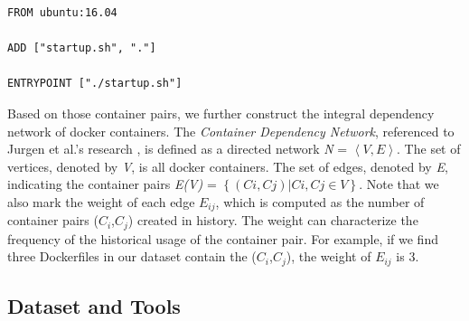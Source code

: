 \documentclass[sigconf]{acmart}
\begin{document}
\begin{lstlisting}[caption= An example of Dockerfile of container Tomcat]
FROM ubuntu:16.04  

ADD ["startup.sh", "."]  
  
ENTRYPOINT ["./startup.sh"]  
\end{lstlisting}

Based on those container pairs, we further construct the integral dependency network of docker containers. The \emph{Container Dependency Network}, referenced to Jurgen et al.'s research \cite{blincoe2015ecosystems}, is defined as a directed network \emph{N} = $\left \langle V,E \right \rangle$. The set of vertices, denoted by \emph{V}, is all docker containers. The set of edges, denoted by \emph{E}, indicating the container pairs \emph{E(V)} = $\left\{ 	\left( Ci, Cj \right)|Ci,Cj \in V \right\}$. %
Note that we also mark the weight of each edge $E_{ij}$, 
which is computed as the number of container pairs ($C_i$,$C_j$) created in history. 
The weight can characterize the frequency of the historical usage of the container pair. 
For example, if we find three Dockerfiles in our dataset contain the ($C_i$,$C_j$), the weight of $E_{ij}$ is 3.\\




\subsection{Dataset and Tools}
\end{document}
